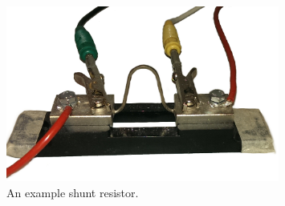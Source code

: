 \begin{figure}[tbh]
    \centering
    \includegraphics[width=0.8\textwidth]{figs/shunt.jpg}
    \caption{An example shunt resistor.}
    \label{fig:shunt}
\end{figure}


